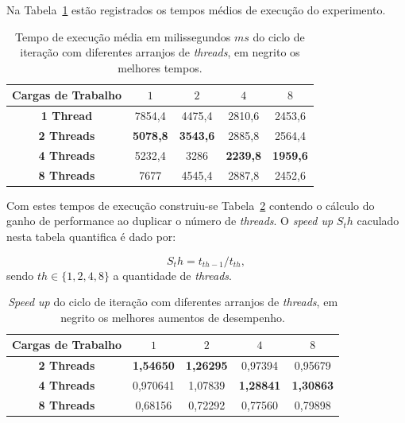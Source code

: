 Na Tabela~\ref{tab1:medium} estão registrados os tempos médios de execução do experimento.

\begin{table}[!htbp]
	\caption{Tempo de execução média em milissegundos $ms$ do ciclo de iteração com diferentes arranjos de \textit{threads}, em negrito os melhores tempos.}
	\centering{}
	\begin{tabular}{c|c|c|c|c}
		\toprule 
		\textbf{Cargas de Trabalho}	& $1$ & $2$ & $4$  & $8$\\ 
		\midrule 
		\textbf{1 Thread} & 7854,4 &	4475,4 &	2810,6 &	2453,6\\ 
		\midrule 
		\textbf{2 Threads} & \textbf{5078,8} &	\textbf{3543,6} &	2885,8 &	2564,4\\ 
		\midrule 
		\textbf{4 Threads} & 5232,4 &	3286 &	\textbf{2239,8} &	\textbf{1959,6}\\ 
		\midrule 
		\textbf{8 Threads} & 7677 &	4545,4 &	2887,8 &	2452,6
		
		\\ 
		\bottomrule 
	\end{tabular} 
	\label{tab1:medium}
\end{table}

Com estes tempos de execução construiu-se Tabela~\ref{tab1:speedup} contendo o cálculo do ganho de performance ao duplicar o número de \textit{threads}. O \textit{speed up} $S_th$ caculado nesta tabela quantifica é dado por:

\begin{equation}
	S_th = t_{th-1}/t_{th},
	\label{eq:speedup1}
\end{equation}
sendo $th \in \{1,2,4,8\}$ a quantidade de \textit{threads}.

\begin{table}[!htbp]
\caption{\textit{Speed up} do ciclo de iteração com diferentes arranjos de \textit{threads}, em negrito os melhores aumentos de desempenho.}
\centering{}
\begin{tabular}{c|c|c|c|c}
	\toprule 
	\textbf{Cargas de Trabalho}	& $1$ & $2$ & $4$  & $8$\\ 
	\midrule 
	\textbf{2 Threads} & \textbf{1,54650} &	\textbf{1,26295} & 0,97394 &	0,95679\\ 
	\midrule 
	\textbf{4 Threads} & 0,970641 &	1,07839 &	\textbf{1,28841} & \textbf{1,30863}\\ 
	\midrule 
	\textbf{8 Threads} & 0,68156 &	0,72292 & 0,77560 & 0,79898
	\\ 
	\bottomrule 
\end{tabular} 
\label{tab1:speedup}
\end{table}

